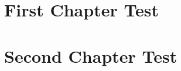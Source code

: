\documentclass[article]{memoir}
\begin{document}
    \chapter{First Chapter Test}\blindtext
    \chapter{Second Chapter Test}\blindtext

    \clearpage
    \clearpage
\end{document}
